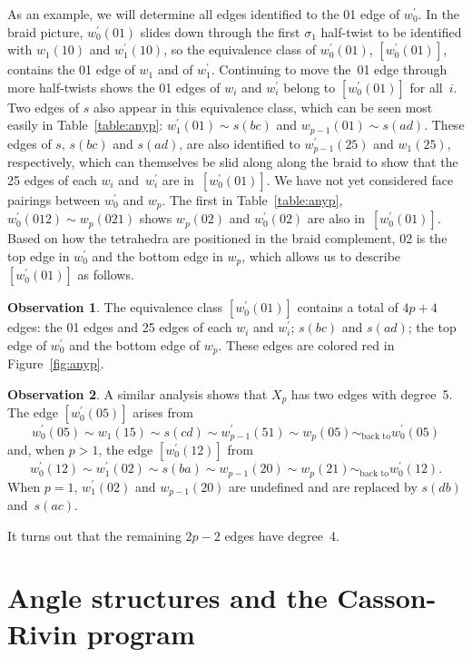 \documentclass[reqno]{amsart}
\theoremstyle{plain}
\theoremstyle{definition}
\newtheorem{observation}{Observation}
\begin{document}
As an example, we will determine all edges identified to the 01 edge of $w_0^\prime$.  In the braid picture, $w_0^\prime(01)$ slides down through the first $\sigma_1$ half-twist to be identified with $w_1(10)$ and $w_1^\prime(10)$, so the equivalence class of $w_0^\prime(01)$, $[w_0^\prime(01)]$, contains the 01 edge of $w_1$ and of $w_1^\prime$.  Continuing to move the~01 edge through more half-twists shows the 01 edges of $w_i$ and $w_i^\prime$ belong to $[w_0^\prime(01)]$ for all~$i$.  Two edges of $s$ also appear in this equivalence class, which can be seen most easily in Table~\ref{table:anyp}:  $w_1^\prime(01)\sim s(bc)$ and $w_{p-1}(01)\sim s(ad)$.  These edges of $s$, $s(bc)$ and $s(ad)$, are also identified to $w_{p-1}^\prime(25)$ and $w_1(25)$, respectively, which can themselves be slid along along the braid to show that the 25 edges of each $w_i$ and~$w_i^\prime$ are in~$[w_0^\prime(01)]$.  We have not yet considered face pairings between $w_0^\prime$ and $w_p$.  The first in Table~\ref{table:anyp}, $w_0^\prime(012)\sim w_p(021)$ shows $w_p(02)$ and $w_0^\prime(02)$ are also in~$[w_0^\prime(01)]$.  Based on how the tetrahedra are positioned in the braid complement, 02 is the top edge in $w_0^\prime$ and the bottom edge in $w_p$, which allows us to describe~$[w_0^\prime(01)]$ as follows.

\begin{observation}\label{obs:veeringred}
The equivalence class $[w_0^\prime(01)]$ contains a total of $4p+4$ edges:  the 01 edges and 25 edges of each $w_i$ and $w_i^\prime$; $s(bc)$ and $s(ad)$; the top edge of $w_0^\prime$ and the bottom edge of $w_p$.  These edges are colored red in Figure~\ref{fig:anyp}.
\end{observation}

\begin{observation}\label{obs:veeringblue5}
A similar analysis shows that $X_{p}$ has two edges with degree~5.  The edge $[w_0^\prime(05)]$ arises from 
$$
w_0^\prime(05)\sim w_1(15)\sim s(cd)\sim w_{p-1}^\prime(51)\sim w_p(05)\sim_{\text{back to}} w_0^\prime(05)
$$
and, when $p>1$, the edge $[w_0^\prime(12)]$ from
$$
w_0^\prime(12)\sim w_1^\prime(02)\sim s(ba)\sim w_{p-1}(20)\sim w_p(21)\sim_{\text{back to}} w_0^\prime(12).
$$
When $p=1$, $w_1^\prime(02)$ and $w_{p-1}(20)$ are undefined and are replaced by $s(db)$ and~$s(ac)$.
\end{observation}

It turns out that the remaining $2p-2$ edges have degree~4.

\section{Angle structures and the Casson-Rivin program}\label{sec:anglestructures}  
\end{document}
